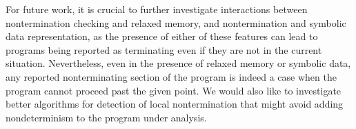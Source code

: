 For future work, it is crucial to further investigate interactions between nontermination checking and relaxed memory, and nontermination and symbolic data representation, as the presence of either of these features can lead to programs being reported as terminating even if they are not in the current situation.
Nevertheless, even in the presence of relaxed memory or symbolic data, any reported nonterminating section of the program is indeed a case when the program cannot proceed past the given point.
We would also like to investigate better algorithms for detection of local nontermination that might avoid adding nondeterminism to the program under analysis.

